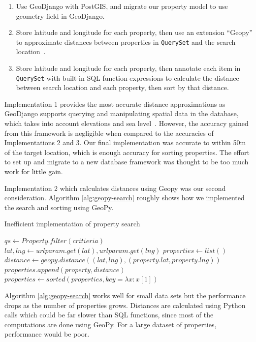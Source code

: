 \begin{enumerate}
  \item Use GeoDjango with PostGIS, and migrate our property model to use
    geometry field in GeoDjango.
  \item Store latitude and longitude for each property, then use an extension
    ``Geopy'' to approximate distances between properties in \texttt{QuerySet}
    and the search location~\parencite{geopy-doc}.
  \item Store latitude and longitude for each property, then annotate each item
    in \texttt{QuerySet} with built-in SQL function expressions to calculate the
    distance between search location and each property, then sort by that
    distance.
\end{enumerate}

Implementation 1 provides the most accurate distance approximations as GeoDjango supports
querying and manipulating spatial data in the database, which takes into account
elevations and sea level~\parencite{geodjango-raster-lookups}. However, the
accuracy gained from this framework is negligible when compared to the accuracies
of Implementations 2 and 3. Our final implementation was accurate to within 50m of the
target location, which is enough accuracy for sorting properties.
The effort to set up and migrate to a new database framework was thought to be
too much work for little gain.

Implementation 2 which calculates distances using Geopy was our second consideration.
Algorithm \ref{alg:geopy-search} roughly shows how we implemented the search and sorting
using GeoPy.

\begin{algorithm}
  \caption{Inefficient implementation of property search}\label{alg:geopy-search}
  \begin{algorithmic}
    \STATE $qs\gets Property.filter(critieria)$
    \STATE $lat, lng\gets urlparam.get(lat), urlparam.get(lng)$
    \STATE $properties\gets list()$
    \STATE $distance\gets geopy.distance((lat, lng), (property.lat, property.lng))$
    \STATE $properties.append(property, distance)$
    \ENDFOR
    \STATE $properties\gets sorted(properties, key=\lambda x: x[1])$
  \end{algorithmic}
\end{algorithm}

Algorithm \ref{alg:geopy-search} works well for small data sets
but the performance drops as the number of properties grows. Distances are
calculated using Python calls which could be far slower than SQL functions,
since most of the computations are done using GeoPy. For a large dataset of properties,
performance would be poor.

